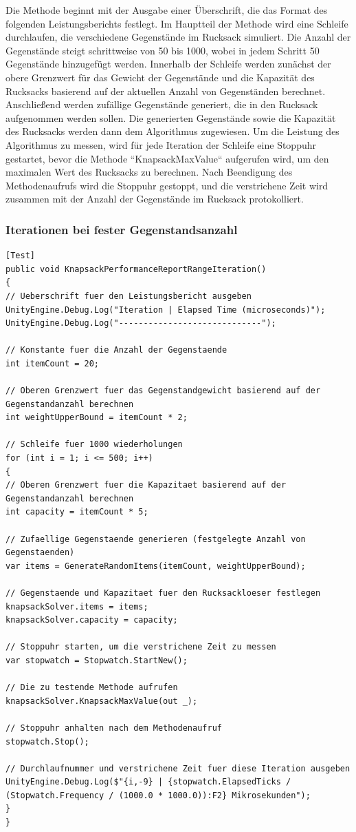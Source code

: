 Die Methode beginnt mit der Ausgabe einer Überschrift, die das Format des folgenden Leistungsberichts festlegt. Im Hauptteil der Methode wird eine Schleife durchlaufen, die verschiedene Gegenstände im Rucksack simuliert. Die Anzahl der Gegenstände steigt schrittweise von 50 bis 1000, wobei in jedem Schritt 50 Gegenstände hinzugefügt werden. Innerhalb der Schleife werden zunächst der obere Grenzwert für das Gewicht der Gegenstände und die Kapazität des Rucksacks basierend auf der aktuellen Anzahl von Gegenständen berechnet. Anschließend werden zufällige Gegenstände generiert, die in den Rucksack aufgenommen werden sollen. Die generierten Gegenstände sowie die Kapazität des Rucksacks werden dann dem Algorithmus zugewiesen.
Um die Leistung des Algorithmus zu messen, wird für jede Iteration der Schleife eine Stoppuhr gestartet, bevor die Methode ``KnapsackMaxValue`` aufgerufen wird, um den maximalen Wert des Rucksacks zu berechnen. Nach Beendigung des Methodenaufrufs wird die Stoppuhr gestoppt, und die verstrichene Zeit wird zusammen mit der Anzahl der Gegenstände im Rucksack protokolliert.

\subsubsection*{Iterationen bei fester Gegenstandsanzahl}

\begin{lstlisting}[style=csharp, caption={Performance Messung bei 500 Aufrufen von 20 Gegenständen}, label={code:performanceIteration}]
[Test]
public void KnapsackPerformanceReportRangeIteration()
{
// Ueberschrift fuer den Leistungsbericht ausgeben
UnityEngine.Debug.Log("Iteration | Elapsed Time (microseconds)");
UnityEngine.Debug.Log("-----------------------------");

// Konstante fuer die Anzahl der Gegenstaende
int itemCount = 20;

// Oberen Grenzwert fuer das Gegenstandgewicht basierend auf der Gegenstandanzahl berechnen
int weightUpperBound = itemCount * 2;

// Schleife fuer 1000 wiederholungen
for (int i = 1; i <= 500; i++)
{
// Oberen Grenzwert fuer die Kapazitaet basierend auf der Gegenstandanzahl berechnen
int capacity = itemCount * 5;

// Zufaellige Gegenstaende generieren (festgelegte Anzahl von Gegenstaenden)
var items = GenerateRandomItems(itemCount, weightUpperBound);

// Gegenstaende und Kapazitaet fuer den Rucksackloeser festlegen
knapsackSolver.items = items;
knapsackSolver.capacity = capacity;

// Stoppuhr starten, um die verstrichene Zeit zu messen
var stopwatch = Stopwatch.StartNew();

// Die zu testende Methode aufrufen
knapsackSolver.KnapsackMaxValue(out _);

// Stoppuhr anhalten nach dem Methodenaufruf
stopwatch.Stop();

// Durchlaufnummer und verstrichene Zeit fuer diese Iteration ausgeben
UnityEngine.Debug.Log($"{i,-9} | {stopwatch.ElapsedTicks / (Stopwatch.Frequency / (1000.0 * 1000.0)):F2} Mikrosekunden");
}
}
\end{lstlisting}


